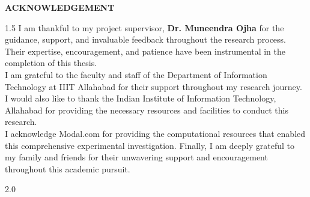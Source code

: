 \begin{center}
    {\large\bfseries ACKNOWLEDGEMENT}
\end{center}

\begin{spacing}{1.5}
I am thankful to my project supervisor, \textbf{Dr. Muneendra Ojha} for the guidance, support, and invaluable feedback throughout the research process. Their expertise, encouragement, and patience have been instrumental in the completion of this thesis.\\[10pt] 

I am grateful to the faculty and staff of the Department of Information Technology at IIIT Allahabad for their support throughout my research journey. I would also like to thank the Indian Institute of Information Technology, Allahabad for providing the necessary resources and facilities to conduct this research.\\[10pt]

I acknowledge Modal.com for providing the computational resources that enabled this comprehensive experimental investigation. Finally, I am deeply grateful to my family and friends for their unwavering support and encouragement throughout this academic pursuit. \\[30 pt]
\end{spacing}

\begin{spacing}{2.0}
\begin{flushright}
    \begin{minipage}{0.5\textwidth}
        \flushright \vspace{60 pt}
        \underline{\hspace{6cm}} \\
         \\[80pt]
    \end{minipage}
\end{flushright}
\end{spacing}
\newpage



